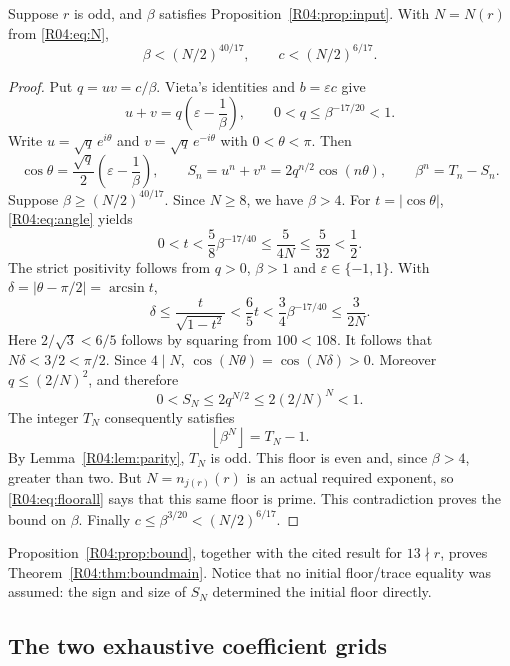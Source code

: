 \documentclass[11pt,a4paper]{article}
\theoremstyle{definition}\newtheorem{definition}[theorem]{Definition}
\theoremstyle{remark}\newtheorem{remark}[theorem]{Remark}
\newcommand{\floor}[1]{\left\lfloor#1\right\rfloor}
\begin{document}
\begin{proposition}\label{R04:prop:bound}
Suppose $r$ is odd, and $\beta$ satisfies
Proposition~\ref{R04:prop:input}. With $N=N(r)$ from \eqref{R04:eq:N},
\[
 \beta<(N/2)^{40/17},\qquad c<(N/2)^{6/17}.
\]
\end{proposition}
\begin{proof}
Put $q=uv=c/\beta$. Vieta's identities and $b=\varepsilon c$ give
\begin{equation}\label{R04:eq:angle}
 u+v=q\left(\varepsilon-\frac1\beta\right),\qquad
 0<q\le\beta^{-17/20}<1.
\end{equation}
Write $u=\sqrt q\,e^{i\theta}$ and $v=\sqrt q\,e^{-i\theta}$ with
$0<\theta<\pi$. Then
\begin{equation}\label{R04:eq:shadow}
 \cos\theta=\frac{\sqrt q}{2}\left(\varepsilon-\frac1\beta\right),
 \qquad S_n=u^n+v^n=2q^{n/2}\cos(n\theta),
 \qquad \beta^n=T_n-S_n.
\end{equation}
Suppose $\beta\ge(N/2)^{40/17}$. Since $N\ge8$, we have $\beta>4$.
For $t=|\cos\theta|$, \eqref{R04:eq:angle} yields
\[
 0<t<\frac58\beta^{-17/40}
 \le\frac5{4N}\le\frac5{32}<\frac12.
\]
The strict positivity follows from $q>0$, $\beta>1$ and
$\varepsilon\in\{-1,1\}$. With $\delta=|\theta-\pi/2|=\arcsin t$,
\[
 \delta\le\frac{t}{\sqrt{1-t^2}}
 <\frac65t
 <\frac34\beta^{-17/40}
 \le\frac3{2N}.
\]
Here $2/\sqrt3<6/5$ follows by squaring from $100<108$.
It follows that $N\delta<3/2<\pi/2$. Since $4\mid N$,
$\cos(N\theta)=\cos(N\delta)>0$.
Moreover $q\le(2/N)^2$, and therefore
\[
 0<S_N\le2q^{N/2}\le2(2/N)^N<1.
\]
The integer $T_N$ consequently satisfies
\[
 \floor{\beta^N}=T_N-1.
\]
By Lemma~\ref{R04:lem:parity}, $T_N$ is odd. This floor is even and,
since $\beta>4$, greater than two. But $N=n_{j(r)}(r)$ is an actual
required exponent, so \eqref{R04:eq:floorall} says that this same floor
is prime. This contradiction proves the bound on $\beta$.
Finally $c\le\beta^{3/20}<(N/2)^{6/17}$.
\end{proof}

Proposition~\ref{R04:prop:bound}, together with the cited result for
$13\nmid r$, proves Theorem~\ref{R04:thm:boundmain}. Notice that no
initial floor/trace equality was assumed: the sign and size of $S_N$
determined the initial floor directly.

\subsection{The two exhaustive coefficient grids}
\label{R04:sec:grids}
\end{document}
